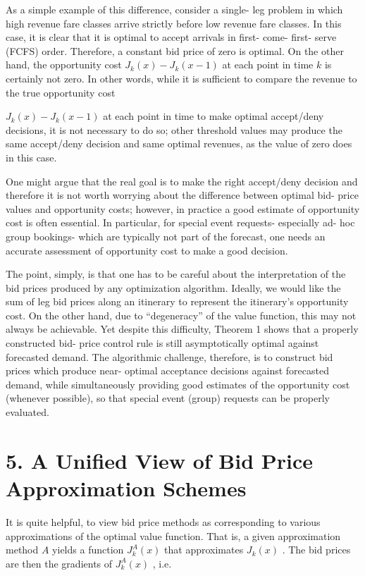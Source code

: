 As a simple example of this difference, consider a single- leg problem
in which high revenue fare classes arrive strictly before low revenue
fare classes. In this case, it is clear that it is optimal to accept
arrivals in first- come- first- serve (FCFS) order. Therefore, a
constant bid price of zero is optimal. On the other hand, the
opportunity cost \(J_{k}(x) - J_{k}(x - 1)\) at each point in time \(k\)
is certainly not zero. In other words, while it is sufficient to compare
the revenue to the true opportunity cost

\(J_{k}(x) - J_{k}(x - 1)\) at each point in time to make optimal
accept/deny decisions, it is not necessary to do so; other threshold
values may produce the same accept/deny decision and same optimal
revenues, as the value of zero does in this case.

One might argue that the real goal is to make the right accept/deny
decision and therefore it is not worth worrying about the difference
between optimal bid- price values and opportunity costs; however, in
practice a good estimate of opportunity cost is often essential. In
particular, for special event requests- especially ad- hoc group
bookings- which are typically not part of the forecast, one needs an
accurate assessment of opportunity cost to make a good decision.

The point, simply, is that one has to be careful about the
interpretation of the bid prices produced by any optimization algorithm.
Ideally, we would like the sum of leg bid prices along an itinerary to
represent the itinerary's opportunity cost. On the other hand, due to
``degeneracy'' of the value function, this may not always be achievable.
Yet despite this difficulty, Theorem 1 shows that a properly constructed
bid- price control rule is still asymptotically optimal against
forecasted demand. The algorithmic challenge, therefore, is to construct
bid prices which produce near- optimal acceptance decisions against
forecasted demand, while simultaneously providing good estimates of the
opportunity cost (whenever possible), so that special event (group)
requests can be properly evaluated.

\section{5. A Unified View of Bid Price Approximation
Schemes}\label{a-unified-view-of-bid-price-approximation-schemes}

It is quite helpful, to view bid price methods as corresponding to
various approximations of the optimal value function. That is, a given
approximation method \(A\) yields a function \(J_{k}^{A}(x)\) that
approximates \(J_{k}(x)\) . The bid prices are then the gradients of
\(J_{k}^{A}(x)\) , i.e.

